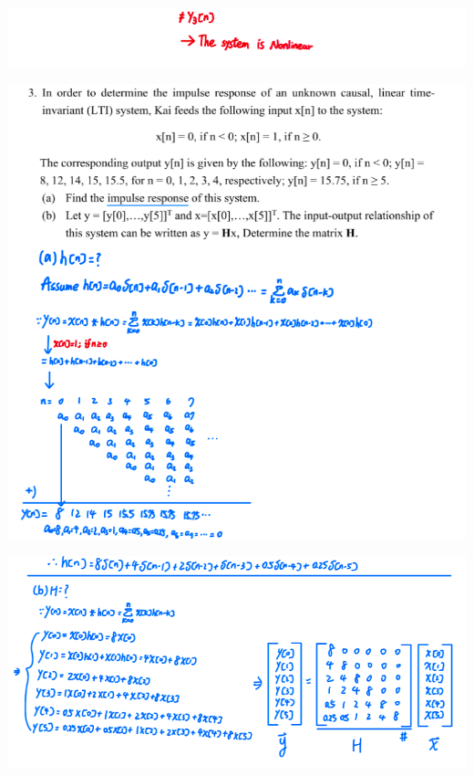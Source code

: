 \documentclass[a4paper]{article}
\begin{document}
	\begin{center}
		\includegraphics[width=1\linewidth]{screenshot013}
	\end{center}
	\begin{center}
		\includegraphics[width=1\linewidth]{screenshot014}
	\end{center}
	\begin{center}
		\includegraphics[width=1\linewidth]{screenshot016}
	\end{center}
	
\end{document}
